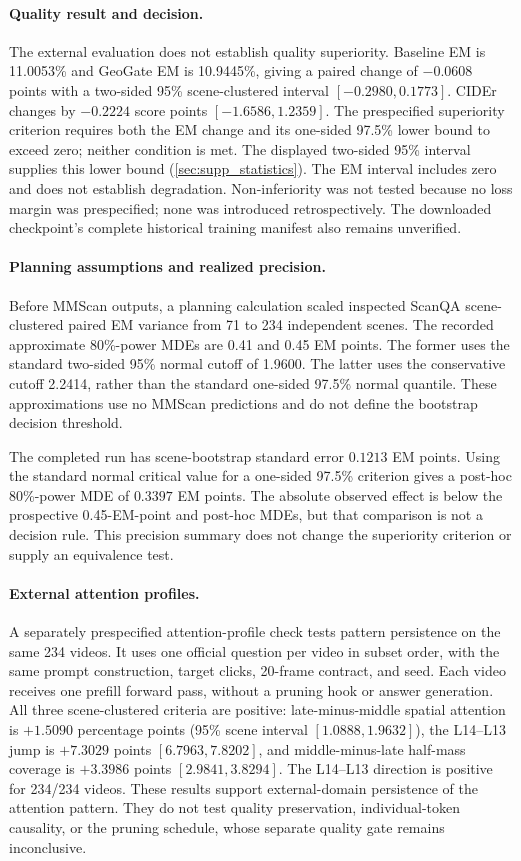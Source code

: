 \paragraph{Quality result and decision.} The external evaluation does not establish quality superiority. Baseline EM is 11.0053\% and GeoGate EM is 10.9445\%, giving a paired change of $-0.0608$ points with a two-sided 95\% scene-clustered interval $[-0.2980,0.1773]$. CIDEr changes by $-0.2224$ score points $[-1.6586,1.2359]$. The prespecified superiority criterion requires both the EM change and its one-sided 97.5\% lower bound to exceed zero; neither condition is met. The displayed two-sided 95\% interval supplies this lower bound (\cref{sec:supp_statistics}). The EM interval includes zero and does not establish degradation. Non-inferiority was not tested because no loss margin was prespecified; none was introduced retrospectively. The downloaded checkpoint's complete historical training manifest also remains unverified.

\paragraph{Planning assumptions and realized precision.} Before MMScan outputs, a planning calculation scaled inspected ScanQA scene-clustered paired EM variance from 71 to 234 independent scenes. The recorded approximate 80\%-power MDEs are 0.41 and 0.45 EM points. The former uses the standard two-sided 95\% normal cutoff of 1.9600. The latter uses the conservative cutoff 2.2414, rather than the standard one-sided 97.5\% normal quantile. These approximations use no MMScan predictions and do not define the bootstrap decision threshold.

The completed run has scene-bootstrap standard error $0.1213$ EM points. Using the standard normal critical value for a one-sided 97.5\% criterion gives a post-hoc 80\%-power MDE of $0.3397$ EM points. The absolute observed effect is below the prospective 0.45-EM-point and post-hoc MDEs, but that comparison is not a decision rule. This precision summary does not change the superiority criterion or supply an equivalence test.

\paragraph{External attention profiles.} A separately prespecified attention-profile check tests pattern persistence on the same 234 videos. It uses one official question per video in subset order, with the same prompt construction, target clicks, 20-frame contract, and seed. Each video receives one prefill forward pass, without a pruning hook or answer generation. All three scene-clustered criteria are positive: late-minus-middle spatial attention is $+1.5090$ percentage points (95\% scene interval $[1.0888,1.9632]$), the L14--L13 jump is $+7.3029$ points $[6.7963,7.8202]$, and middle-minus-late half-mass coverage is $+3.3986$ points $[2.9841,3.8294]$. The L14--L13 direction is positive for 234/234 videos. These results support external-domain persistence of the attention pattern. They do not test quality preservation, individual-token causality, or the pruning schedule, whose separate quality gate remains inconclusive.

